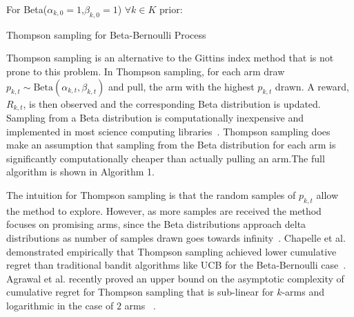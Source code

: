\documentclass[10pt, conference]{ieeeconf}      %
\begin{document}
\begin{algorithm}
 For Beta($\alpha_{k,0}=1$,$\beta_{k,0}=1$) $\forall k \in K$ prior: \\
 \caption{Thompson sampling for Beta-Bernoulli Process}
\end{algorithm}

Thompson sampling is an alternative to the Gittins index method that is not prone to this problem. 
In Thompson sampling, for each arm draw $p_{k,t} \sim \mbox{Beta}(\alpha_{k,t},\beta_{k,t})$ and pull, the arm with the highest $p_{k,t}$ drawn.
A reward, $R_{k,t}$, is then observed and the corresponding Beta distribution is updated. Sampling from a Beta distribution is computationally inexpensive and implemented  in most science computing libraries~\cite{MATLAB:2010}. Thompson sampling does make an assumption that sampling from the Beta distribution for each arm is significantly computationally cheaper than actually pulling an arm.The full algorithm is shown in Algorithm 1.

The intuition for Thompson sampling is that the random samples of $p_{k,t}$ allow the method to explore. However, as more samples are received the method focuses on promising arms, since the Beta distributions approach delta distributions as number of samples drawn goes towards infinity~\cite{goetschalckx2011continuous}. Chapelle et al. demonstrated empirically that Thompson sampling achieved lower cumulative regret than traditional bandit algorithms like UCB for the Beta-Bernoulli case~\cite{chapelle2011empirical}. Agrawal et al. recently proved an upper bound on the asymptotic complexity of  cumulative regret for  Thompson sampling that is sub-linear for $k$-arms and logarithmic in the case of $2$ arms ~\cite{agrawal2011analysis}. 
\end{document}
